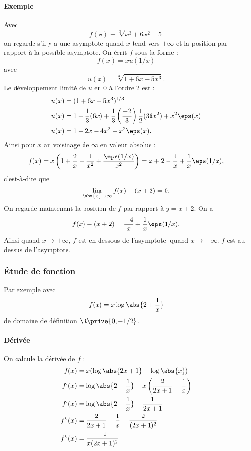 \paragraph{Exemple}Avec \[ f(x) = \sqrt[3]{x^{3} + 6x^{2} - 5}\]on regarde s'il y a une asymptote quand $x$ tend vers $\pm \infty$ et la position par rapport à la possible asymptote. On écrit $f$ sous la forme : \[ f(x) = x u(1/x)\]avec \[ u(x) = \sqrt[3]{1 + 6x - 5x^{3}}.\]
Le développement limité de $u$ en $0$ à l'ordre $2$ est : 
\begin{align*}
u(x) &= (1+6x - 5x^{3})^{1/3} \\
u(x) &= 1 + \frac{1}{3}(6x) + \frac{1}{3}\left(\frac{-2}{3}\right)\frac{1}{2}(36x^{2}) + x^{2}\eps(x) \\
u(x) &= 1 + 2x - 4x^{2} + x^{2}\eps(x).
\end{align*}
Ainsi pour $x$ au voisinage de $\infty$ en valeur absolue : \[ f(x) = x\left(1+\frac{2}{x}-\frac{4}{x^{2}}+\frac{\eps(1/x)}{x^{2}} \right) = x+2 -\frac{4}{x} + \frac{1}{x}\eps(1/x),\]c'est-à-dire que \[ \lim_{\abs{x}\to\infty}f(x) - (x+2) = 0.\]
On regarde maintenant la position de $f$ par rapport à $y = x+2$. On a \[ f(x) - (x+2) = \frac{-4}{x} + \frac{1}{x}\eps(1/x).\]Ainsi quand $x\to+\infty$, $f$ est en-dessous de l'asymptote, quand $x\to -\infty$, $f$ est au-dessus de l'asymptote.

\subsubsection{\'Etude de fonction}Par exemple avec \[ f(x) = x \log\abs{2 + \frac{1}{x}}\]de domaine de définition $\R\prive{0,-1/2}$.

\paragraph{Dérivée}On calcule la dérivée de $f$ : 
\begin{align*}
f(x) &= x(\log\abs{2x+1} - \log\abs{x}) \\
f'(x) &= \log\abs{2+\frac{1}{x}} + x\left(\frac{2}{2x+1} -\frac{1}{x}\right)\\
f'(x) &= \log\abs{2+\frac{1}{x}} - \frac{1}{2x+1}\\
f''(x) &= \frac{2}{2x+1} - \frac{1}{x} - \frac{2}{(2x+1)^{2}}\\
f''(x) &= \frac{-1}{x(2x+1)^{2}}
\end{align*}

